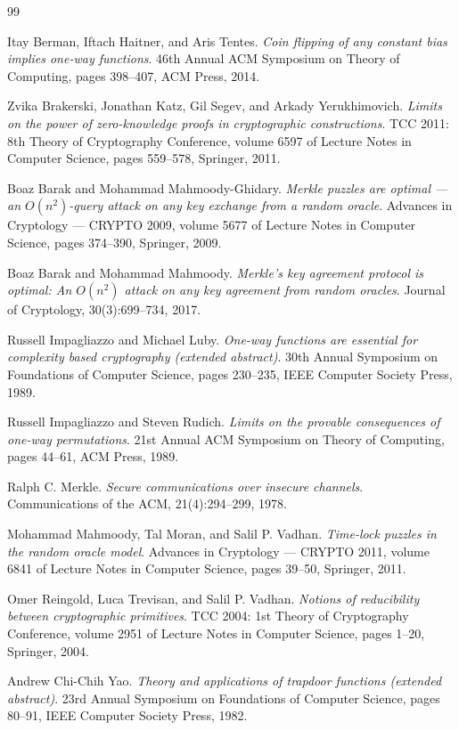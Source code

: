 \documentclass{conjura-conjecture}
\begin{document}
\begin{conjurabibliography}{99}

Itay Berman, Iftach Haitner, and Aris Tentes.
\emph{Coin flipping of any constant bias implies one-way functions}.
46th Annual ACM Symposium on Theory of Computing, pages 398--407, ACM
Press, 2014.

Zvika Brakerski, Jonathan Katz, Gil Segev, and Arkady Yerukhimovich.
\emph{Limits on the power of zero-knowledge proofs in cryptographic
constructions}.
TCC 2011: 8th Theory of Cryptography Conference, volume 6597 of Lecture
Notes in Computer Science, pages 559--578, Springer, 2011.

Boaz Barak and Mohammad Mahmoody-Ghidary.
\emph{Merkle puzzles are optimal --- an $O(n^{2})$-query attack on any
key exchange from a random oracle}.
Advances in Cryptology --- CRYPTO 2009, volume 5677 of Lecture Notes in
Computer Science, pages 374--390, Springer, 2009.

Boaz Barak and Mohammad Mahmoody.
\emph{Merkle's key agreement protocol is optimal: An $O(n^{2})$ attack on
any key agreement from random oracles}.
Journal of Cryptology, 30(3):699--734, 2017.

Russell Impagliazzo and Michael Luby.
\emph{One-way functions are essential for complexity based cryptography
(extended abstract)}.
30th Annual Symposium on Foundations of Computer Science, pages 230--235,
IEEE Computer Society Press, 1989.

Russell Impagliazzo and Steven Rudich.
\emph{Limits on the provable consequences of one-way permutations}.
21st Annual ACM Symposium on Theory of Computing, pages 44--61, ACM
Press, 1989.

Ralph C. Merkle.
\emph{Secure communications over insecure channels}.
Communications of the ACM, 21(4):294--299, 1978.

Mohammad Mahmoody, Tal Moran, and Salil P. Vadhan.
\emph{Time-lock puzzles in the random oracle model}.
Advances in Cryptology --- CRYPTO 2011, volume 6841 of Lecture Notes in
Computer Science, pages 39--50, Springer, 2011.

Omer Reingold, Luca Trevisan, and Salil P. Vadhan.
\emph{Notions of reducibility between cryptographic primitives}.
TCC 2004: 1st Theory of Cryptography Conference, volume 2951 of Lecture
Notes in Computer Science, pages 1--20, Springer, 2004.

Andrew Chi-Chih Yao.
\emph{Theory and applications of trapdoor functions (extended abstract)}.
23rd Annual Symposium on Foundations of Computer Science, pages 80--91,
IEEE Computer Society Press, 1982.

\end{conjurabibliography}
\end{document}
